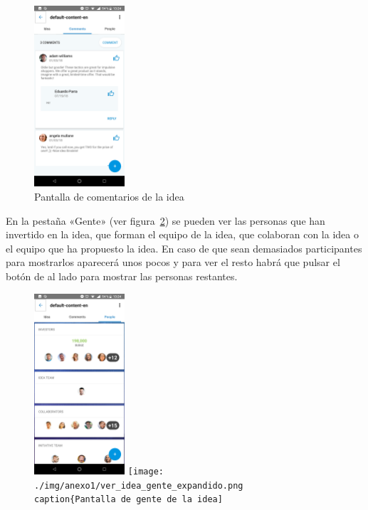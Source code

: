 \begin{figure}[!h]
	\begin{center}
		\includegraphics[width=0.3\textwidth]{./img/anexo1/ver_idea_comentarios.png}
		\caption{Pantalla de comentarios de la idea}
		\label{fig:ver_idea_comentarios}
	\end{center}
\end{figure}

En la pestaña «Gente» (ver figura~\ref{fig:ver_idea_gente}) se pueden ver las personas 
que han invertido en la idea, que forman el equipo de la idea, que colaboran con la idea o 
el equipo que ha propuesto la idea. En caso de que sean demasiados participantes para 
mostrarlos aparecerá unos pocos y para ver el resto habrá que pulsar el botón de al lado 
para mostrar las personas restantes.

\begin{figure}[!h]
	\begin{center}
		\includegraphics[width=0.3\textwidth]{./img/anexo1/ver_idea_gente.png}
		\texttt{[image: ./img/anexo1/ver\_idea\_gente\_expandido.png
		\\caption\{Pantalla de gente de la idea]}
		\label{fig:ver_idea_gente}
	\end{center}
\end{figure}

